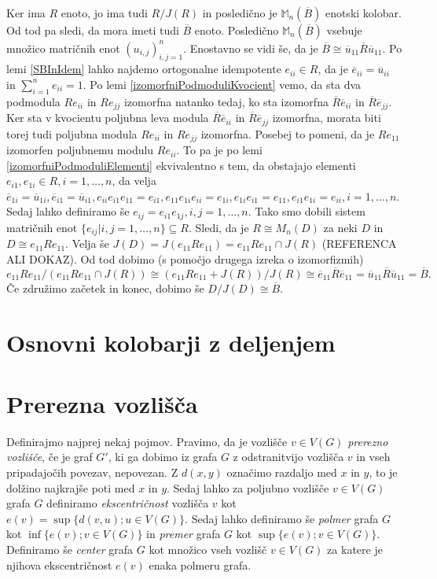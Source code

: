 \documentclass[a4paper, 12pt]{amsart}
\theoremstyle{definition} %
\theoremstyle{plain} %
\newcommand{\M}{\mathbb M}
\begin{document}
\proof
Ker ima $R$ enoto, jo ima tudi $R/J(R)$ in posledično je $\M_n(\overline{B})$ enotski kolobar. Od tod pa sledi, da mora imeti tudi $\overline{B}$ enoto. Posledično $\M_n(\overline{B})$ vsebuje množico matričnih enot $(u_{i,j})_{i,j=1}^n$. Enostavno se vidi še, da je $\overline{B}\cong \overline{u}_{11}\overline{R} \overline{u}_{11} $. Po lemi \ref{SBInIdem} lahko najdemo ortogonalne idempotente $e_{ii} \in R$, da je $\overline{e}_{ii} = \overline{u}_{ii}$ in $\sum_{i=1}^n e_{ii} = 1$. Po lemi \ref{izomorfniPodmoduliKvocient} vemo, da sta dva podmodula $Re_{ii}$ in $Re_{jj}$ izomorfna natanko tedaj, ko sta izomorfna $\overline{R} \overline{e}_{ii}$ in $\overline{R}\overline{e}_{jj}$. Ker sta v kvocientu poljubna leva modula $\overline{R} \overline{e}_{ii}$ in $\overline{R}\overline{e}_{jj}$ izomorfna, morata biti torej tudi poljubna modula $Re_{ii}$ in $Re_{jj}$ izomorfna. Posebej to pomeni, da je $Re_{11}$ izomorfen poljubnemu modulu $Re_{ii}$. To pa je po lemi \ref{izomorfniPodmoduliElementi} ekvivalentno s tem, da obstajajo elementi $e_{i1}, e_{1i}\in R, i=1,\dots,n$, da velja $\overline{e}_{1i} = \overline{u}_{1i}, \overline{e}_{i1} = \overline{u}_{i1}, e_{ii}e_{i1}e_{11} = e_{i1}, e_{11} e_{1i}e_{ii} = e_{1i}, e_{1i} e_{i1} = e_{11}, e_{i1} e_{1i} = e_{ii}, i = 1,\dots,n$. Sedaj lahko definiramo še $e_{ij} = e_{i1}e_{1j}, i, j = 1,\dots,n$. Tako smo dobili sistem matričnih enot $\{ e_{ij}|i,j=1,\dots,n\} \subseteq R$. Sledi, da je $R\cong M_n(D)$ za neki $D$ in $D\cong e_{11} R e_{11}$. Velja še $J(D) = J(e_{11} R e_{11}) = e_{11} R e_{11} \cap J(R)$ (REFERENCA ALI DOKAZ). Od tod dobimo (s pomočjo drugega izreka o izomorfizmih)
$$
e_{11}Re_{11} / (e_{11} R e_{11} \cap J(R)) \cong (e_{11} R e_{11} + J(R))/J(R) \cong \overline{e}_{11} \overline{R} \overline{e}_{11} = \overline{u}_{11} \overline{R} \overline{u}_{11} = \overline{B}.
$$
Če združimo začetek in konec, dobimo še $D/J(D) \cong \overline{B}$.
\endproof

\section{Osnovni kolobarji z deljenjem}

\section{Prerezna vozlišča}
Definirajmo najprej nekaj pojmov. Pravimo, da je vozlišče $v\in V(G)$ \emph{prerezno vozlišče}, če je graf $G'$, ki ga dobimo iz grafa $G$ z odstranitvijo vozlišča $v$ in vseh pripadajočih povezav, nepovezan. Z $d(x,y)$ označimo razdaljo med $x$ in $y$, to je dolžino najkrajše poti med $x$ in $y$. Sedaj lahko za poljubno vozlišče $v \in V(G)$ grafa $G$ definiramo \emph{ekscentričnost} vozlišča $v$ kot $e(v) = \sup\{d(v,u);u\in V(G)\}$. Sedaj lahko definiramo še \emph{polmer} grafa $G$ kot $\inf\{e(v); v\in V(G)\}$ in \emph{premer} grafa $G$ kot $\sup\{ e(v); v\in V(G)\}$. Definiramo še \emph{center} grafa $G$ kot množico vseh vozlišč $v\in V(G)$ za katere je njihova ekscentričnost $e(v)$ enaka polmeru grafa.
\end{document}
